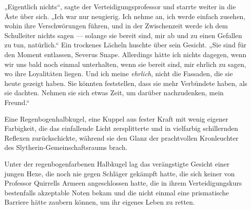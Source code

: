 „Eigentlich nichts“, sagte der Verteidigungsprofessor und starrte weiter in die Äste über sich.
„Ich war nur neugierig. Ich nehme an, ich werde einfach zusehen, wohin ihre Verschwörungen führen, und in der Zwischenzeit werde ich dem Schulleiter nichts sagen — solange sie bereit sind, mir ab und zu einen Gefallen zu tun, natürlich.“ Ein trockenes Lächeln huschte über sein Gesicht.
„Sie sind für den Moment entlassen, Severus Snape. Allerdings hätte ich nichts dagegen, wenn wir uns bald noch einmal unterhalten, wenn sie bereit sind, mir ehrlich zu sagen, wo ihre Loyalitäten liegen. Und ich meine \emph{ehrlich}, nicht die Fassaden, die sie heute gezeigt haben. Sie könnten feststellen, dass sie mehr Verbündete haben, als sie dachten. Nehmen sie sich etwas Zeit, um darüber nachzudenken, mein Freund.“


Eine Regenbogenhalbkugel, eine Kuppel aus fester Kraft mit wenig eigener Farbigkeit, die das einfallende Licht zersplitterte und in vielfarbig schillernden Reflexen zurückschickte, während sie den Glanz der prachtvollen Kronleuchter des Slytherin-Gemeinschaftsraums brach.

Unter der regenbogenfarbenen Halbkugel lag das verängstigte Gesicht einer jungen Hexe, die noch nie gegen Schläger gekämpft hatte, die sich keiner von Professor Quirrells Armeen angeschlossen hatte, die in ihrem Verteidigungskurs bestenfalls akzeptable Noten bekam und die nicht einmal eine prismatische Barriere hätte zaubern können, um ihr eigenes Leben zu retten.


